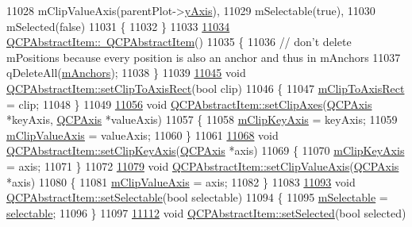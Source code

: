 \begin{DoxyCode}
11028   mClipValueAxis(parentPlot->\hyperlink{a00116_af168096ce67002b1fbce18ae5dd1b652}{yAxis}),
11029   mSelectable(true),
11030   mSelected(false)
11031 \{
11032 \}
11033 
\hypertarget{a00115_source_l11034}{}\hyperlink{a00022_a375bd1b7d3218b04a6ff7ff06fff917c}{11034} \hyperlink{a00022_a375bd1b7d3218b04a6ff7ff06fff917c}{QCPAbstractItem::~QCPAbstractItem}()
11035 \{
11036   \textcolor{comment}{// don't delete mPositions because every position is also an anchor and thus in mAnchors}
11037   qDeleteAll(\hyperlink{a00022_a909a3abab783de302ebf0a0e6f2bbc15}{mAnchors});
11038 \}
11039 
\hypertarget{a00115_source_l11045}{}\hyperlink{a00022_a39e05b9d4176b9accafc746d16ca6a06}{11045} \textcolor{keywordtype}{void} \hyperlink{a00022_a39e05b9d4176b9accafc746d16ca6a06}{QCPAbstractItem::setClipToAxisRect}(\textcolor{keywordtype}{bool} clip)
11046 \{
11047   \hyperlink{a00022_ad2a70ff6b658fcb84a9427f69d3f587d}{mClipToAxisRect} = clip;
11048 \}
11049 
\hypertarget{a00115_source_l11056}{}\hyperlink{a00022_aa80abbbdcbfc40994443b03108160aee}{11056} \textcolor{keywordtype}{void} \hyperlink{a00022_aa80abbbdcbfc40994443b03108160aee}{QCPAbstractItem::setClipAxes}(\hyperlink{a00025}{QCPAxis} *keyAxis, 
      \hyperlink{a00025}{QCPAxis} *valueAxis)
11057 \{
11058   \hyperlink{a00022_aa789a7e04cef1f8291409eef58068518}{mClipKeyAxis} = keyAxis;
11059   \hyperlink{a00022_a5305649de1638fcd59b4356f101d81a9}{mClipValueAxis} = valueAxis;
11060 \}
11061 
\hypertarget{a00115_source_l11068}{}\hyperlink{a00022_a8c3e15a8a99fd011c3c017324cd9e4b1}{11068} \textcolor{keywordtype}{void} \hyperlink{a00022_a8c3e15a8a99fd011c3c017324cd9e4b1}{QCPAbstractItem::setClipKeyAxis}(\hyperlink{a00025}{QCPAxis} *axis)
11069 \{
11070   \hyperlink{a00022_aa789a7e04cef1f8291409eef58068518}{mClipKeyAxis} = axis;
11071 \}
11072 
\hypertarget{a00115_source_l11079}{}\hyperlink{a00022_a3cf88353e12d1d0d3bdc20a3b17e1a01}{11079} \textcolor{keywordtype}{void} \hyperlink{a00022_a3cf88353e12d1d0d3bdc20a3b17e1a01}{QCPAbstractItem::setClipValueAxis}(\hyperlink{a00025}{QCPAxis} *axis)
11080 \{
11081   \hyperlink{a00022_a5305649de1638fcd59b4356f101d81a9}{mClipValueAxis} = axis;
11082 \}
11083 
\hypertarget{a00115_source_l11093}{}\hyperlink{a00022_a8a8e32a55bc478b849756a78c2d87fd2}{11093} \textcolor{keywordtype}{void} \hyperlink{a00022_a8a8e32a55bc478b849756a78c2d87fd2}{QCPAbstractItem::setSelectable}(\textcolor{keywordtype}{bool} selectable)
11094 \{
11095   \hyperlink{a00022_ad81eb35c8726a0f458db9df9732e0e41}{mSelectable} = \hyperlink{a00022_a9189e752025533e1595eaade0009a3bc}{selectable};
11096 \}
11097 
\hypertarget{a00115_source_l11112}{}\hyperlink{a00022_a203de94ad586cc44d16c9565f49d3378}{11112} \textcolor{keywordtype}{void} \hyperlink{a00022_a203de94ad586cc44d16c9565f49d3378}{QCPAbstractItem::setSelected}(\textcolor{keywordtype}{bool} selected)

\end{DoxyCode}
